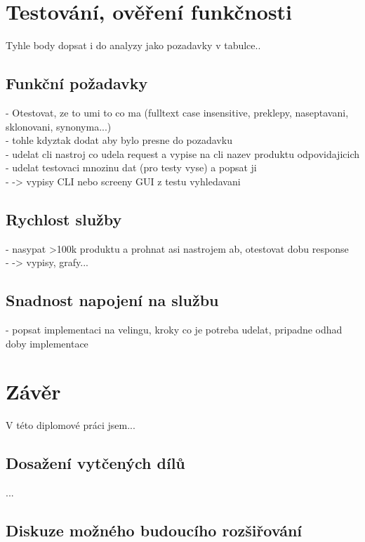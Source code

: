 \documentclass[FM,DP]{tulthesis}
\begin{document}
\chapter{Testování, ověření funkčnosti}

Tyhle body dopsat i do analyzy jako pozadavky v tabulce..

\section{Funkční požadavky}
    - Otestovat, ze to umi to co ma (fulltext case insensitive, preklepy, naseptavani, sklonovani, synonyma...)\\
	- tohle kdyztak dodat aby bylo presne do pozadavku\\
	- udelat cli nastroj co udela request a vypise na cli nazev produktu odpovidajicich\\
	- udelat testovaci mnozinu dat (pro testy vyse) a popsat ji\\
	- -> vypisy CLI nebo screeny GUI z testu vyhledavani\\

\section{Rychlost služby}
	- nasypat >100k produktu a prohnat asi nastrojem ab, otestovat dobu response\\
	- -> vypisy, grafy...\\

\section{Snadnost napojení na službu}
	- popsat implementaci na velingu, kroky co je potreba udelat, pripadne odhad doby implementace


\chapter{Závěr}

V této diplomové práci jsem...

\section{Dosažení vytčených dílů}

...

\section{Diskuze možného budoucího rozšiřování}
\end{document}
